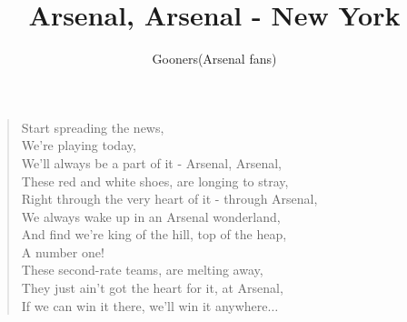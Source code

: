 \documentclass[a4paper,12pt]{article}
\title{Arsenal, Arsenal - New York}
\author{Gooners(Arsenal fans)}
\date{}
\begin{document}
	
	\maketitle
	
	\begin{verse}
		
		Start spreading the news, \\
		We're playing today, \\
		We'll always be a part of it - Arsenal, Arsenal, \\
		These red and white shoes, are longing to stray, \\
		Right through the very heart of it - through Arsenal, \\
		We always wake up in an Arsenal wonderland, \\
		And find we're king of the hill, top of the heap, \\ 
		A number one! \\
		These second-rate teams, are melting away, \\
		They just ain't got the heart for it, at Arsenal, \\
		If we can win it there, we'll win it anywhere$\ldots$
		
	\end{verse}
	
\end{document}
